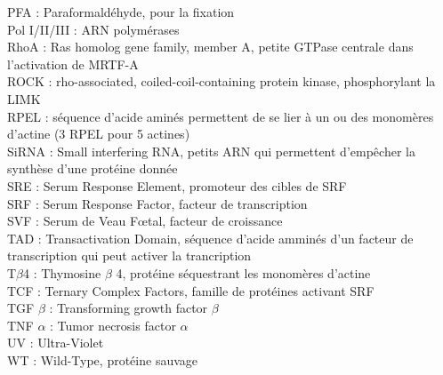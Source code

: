 PFA : Paraformaldéhyde, pour la fixation\\
Pol I/II/III : ARN polymérases\\
RhoA : Ras homolog gene family, member A, petite GTPase centrale dans l'activation de MRTF-A\\
ROCK : rho-associated, coiled-coil-containing protein kinase, phosphorylant la LIMK\\
RPEL : séquence d'acide aminés permettent de se lier à un ou des monomères d'actine (3 RPEL pour 5 actines)\\
SiRNA : Small interfering RNA, petits ARN qui permettent d'empêcher la synthèse d'une protéine donnée\\
SRE : Serum Response Element, promoteur des cibles de SRF\\
SRF : Serum Response Factor, facteur de transcription \\
SVF : Serum de Veau F\oe tal, facteur de croissance\\
TAD : Transactivation Domain, séquence d'acide amminés d'un facteur de transcription qui peut activer la trancription\\
T$\beta$4 : Thymosine $\beta$ 4, protéine séquestrant les monomères d'actine\\
TCF : Ternary Complex Factors, famille de protéines activant SRF\\
TGF $\beta$ : Transforming growth factor $\beta$\\
TNF $\alpha$ : Tumor necrosis factor $\alpha$\\
UV : Ultra-Violet\\
WT : Wild-Type, protéine sauvage\\